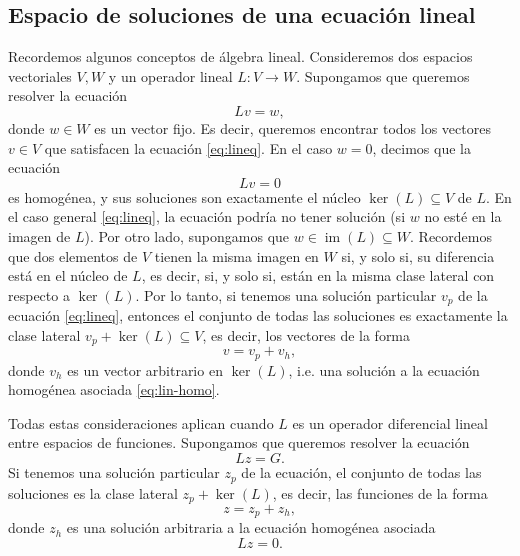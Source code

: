 \documentclass[11pt,letterpaper,draft]{report}
\theoremstyle{plain}
\theoremstyle{definition}
\theoremstyle{remark}
\newcommand\<{\langle}
\renewcommand\>{\rangle}
\begin{document}
\subsection{Espacio de soluciones de una ecuación lineal}

Recordemos algunos conceptos de álgebra lineal.
Consideremos dos espacios vectoriales \(V,W\) y un operador lineal
\(L\colon V\to W\).
Supongamos que queremos resolver la ecuación
\begin{equation}
  \label{eq:lineq}
  Lv=w
,\end{equation}
donde \(w\in W\) es un vector fijo.
Es decir, queremos encontrar todos los vectores \(v\in V\)
que satisfacen la ecuación \eqref{eq:lineq}.
En el caso \(w=0\), decimos que la ecuación
\begin{equation}
  \label{eq:lin-homo}
  Lv=0
\end{equation}
es homogénea, y sus soluciones son exactamente el núcleo
\(\ker(L)\subseteq V\) de \(L\).
En el caso general \eqref{eq:lineq}, la ecuación podría no tener solución
(si \(w\) no esté en la imagen de \(L\)).
Por otro lado, supongamos que \(w\in\operatorname{im}(L)\subseteq W\).
Recordemos que dos elementos de \(V\) tienen la misma imagen
en \(W\) si, y solo si, su diferencia está en el núcleo de \(L\), es
decir, si, y solo si, están en la misma clase lateral con respecto a
\(\ker(L)\). Por lo tanto, si tenemos una solución particular \(v_p\)
de la ecuación \eqref{eq:lineq}, entonces el conjunto de todas las
soluciones es exactamente la clase lateral \(v_p+\ker(L)\subseteq V\),
es decir, los vectores de la forma
\begin{equation}
  v = v_p + v_h
,\end{equation}
donde \(v_h\) es un vector arbitrario en \(\ker(L)\), i.e. una solución a la
ecuación homogénea asociada \eqref{eq:lin-homo}.

Todas estas consideraciones aplican cuando \(L\) es un
operador diferencial lineal entre espacios de funciones.
Supongamos que queremos resolver la ecuación
\begin{equation}
  \label{eq:lineal-operador}
  Lz = G.
\end{equation}
Si tenemos una solución particular \(z_p\) de la
ecuación, el conjunto de todas las soluciones es la clase lateral
\(z_p + \ker(L)\), es decir, las funciones de la forma
\begin{equation}
  z = z_p + z_h
,\end{equation}
donde \(z_h\) es una solución arbitraria a la ecuación homogénea
asociada
\begin{equation}
  \label{eq:lineal-operador-homo}
  Lz = 0.
\end{equation}
\end{document}

